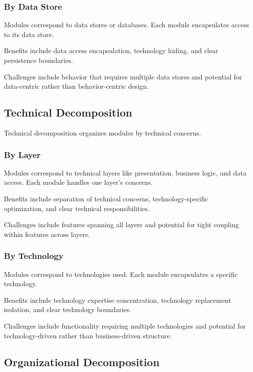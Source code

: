 \documentclass[11pt]{article}
\begin{document}
\subsubsection{By Data Store}

Modules correspond to data stores or databases. Each module encapsulates access to its data store.

Benefits include data access encapsulation, technology hiding, and clear persistence boundaries.

Challenges include behavior that requires multiple data stores and potential for data-centric rather than behavior-centric design.

\subsection{Technical Decomposition}

Technical decomposition organizes modules by technical concerns.

\subsubsection{By Layer}

Modules correspond to technical layers like presentation, business logic, and data access. Each module handles one layer's concerns.

Benefits include separation of technical concerns, technology-specific optimization, and clear technical responsibilities.

Challenges include features spanning all layers and potential for tight coupling within features across layers.

\subsubsection{By Technology}

Modules correspond to technologies used. Each module encapsulates a specific technology.

Benefits include technology expertise concentration, technology replacement isolation, and clear technology boundaries.

Challenges include functionality requiring multiple technologies and potential for technology-driven rather than business-driven structure.

\subsection{Organizational Decomposition}
\end{document}
